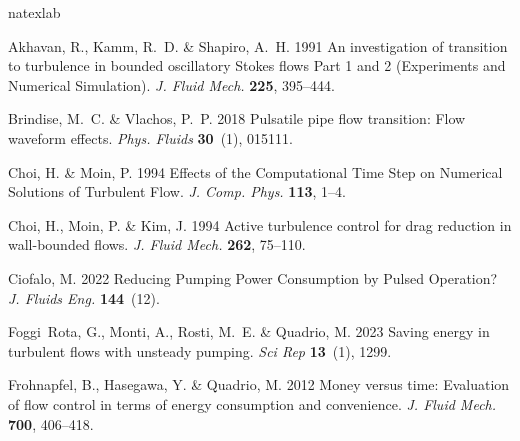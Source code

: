 \documentclass[lineno]{jfm}
\begin{document}

\begin{thebibliography}{23}
\expandafter\ifx\csname natexlab\endcsname\relax\def\natexlab#1{#1}\fi
\def\au#1{#1} \def\ed#1{#1} \def\yr#1{#1}\def\at#1{#1}\def\jt#1{\textit{#1}}
  \def\bt#1{#1}\def\bvol#1{\textbf{#1}} \def\vol#1{#1} \def\pg#1{#1}
  \def\publ#1{#1}\def\arxiv#1{#1}\def\org#1{#1}\def\st#1{\textit{#1}}

{\sc \au{Akhavan, R.}, \au{Kamm, R.~D.} \& \au{Shapiro, A.~H.}} \yr{1991}
  \at{An investigation of transition to turbulence in bounded oscillatory
  {{Stokes}} flows \textendash{} {{Part}} 1 and 2 ({{Experiments}} and
  {{Numerical Simulation}})}.  \jt{J. Fluid Mech.}  \bvol{225},  \pg{395--444}.

{\sc \au{Brindise, M.~C.} \& \au{Vlachos, P.~P.}} \yr{2018}  \at{Pulsatile pipe
  flow transition: {{Flow}} waveform effects}.  \jt{Phys. Fluids}
  \bvol{30}~(1),  \pg{015111}.

{\sc \au{Choi, H.} \& \au{Moin, P.}} \yr{1994}  \at{Effects of the
  {{Computational Time Step}} on {{Numerical Solutions}} of {{Turbulent
  Flow}}}.  \jt{J. Comp. Phys.}  \bvol{113},  \pg{1--4}.

{\sc \au{Choi, H.}, \au{Moin, P.} \& \au{Kim, J.}} \yr{1994}  \at{Active
  turbulence control for drag reduction in wall-bounded flows}.  \jt{J. Fluid
  Mech.}  \bvol{262},  \pg{75--110}.

{\sc \au{Ciofalo, M.}} \yr{2022}  \at{Reducing {{Pumping Power Consumption}} by
  {{Pulsed Operation}}?}  \jt{J. Fluids Eng.}  \bvol{144}~(12).

{\sc \au{Foggi~Rota, G.}, \au{Monti, A.}, \au{Rosti, M.~E.} \& \au{Quadrio,
  M.}} \yr{2023}  \at{Saving energy in turbulent flows with unsteady pumping}.
  \jt{Sci Rep}  \bvol{13}~(1),  \pg{1299}.

{\sc \au{Frohnapfel, B.}, \au{Hasegawa, Y.} \& \au{Quadrio, M.}} \yr{2012}
  \at{Money versus time: Evaluation of flow control in terms of energy
  consumption and convenience}.  \jt{J. Fluid Mech.}  \bvol{700},
  \pg{406--418}.


\end{thebibliography}
\end{document}
